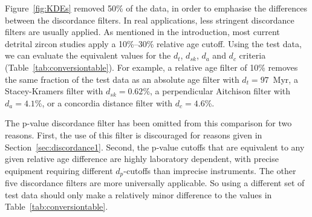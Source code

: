 \documentclass[gchron, manuscript]{copernicus}
\begin{document}
Figure~\ref{fig:KDEs} removed 50\% of the data, in order to emphasise
the differences between the discordance filters. In real applications,
less stringent discordance filters are usually applied. As mentioned
in the introduction, most current detrital zircon studies apply a
10\%--30\% relative age cutoff.  Using the test data, we can evaluate
the equivalent values for the $d_t$, $d_{sk}$, $d_a$ and $d_c$
criteria (Table~\ref{tab:conversiontable}). For example, a relative
age filter of 10\% removes the same fraction of the test data as an
absolute age filter with $d_t=97$~Myr, a Stacey-Kramers filter with
$d_{sk}=0.62$\%, a perpendicular Aitchison filter with $d_a=4.1$\%, or
a concordia distance filter with $d_c=4.6$\%.

The p-value discordance filter has been omitted from this comparison
for two reasons. First, the use of this filter is discouraged for
reasons given in Section~\ref{sec:discordance1}. Second, the p-value
cutoffs that are equivalent to any given relative age difference are
highly laboratory dependent, with precise equipment requiring
different $d_p$-cutoffs than imprecise instruments. The other five
discordance filters are more universally applicable. So using a
different set of test data should only make a relatively minor
difference to the values in Table~\ref{tab:conversiontable}.
\end{document}
